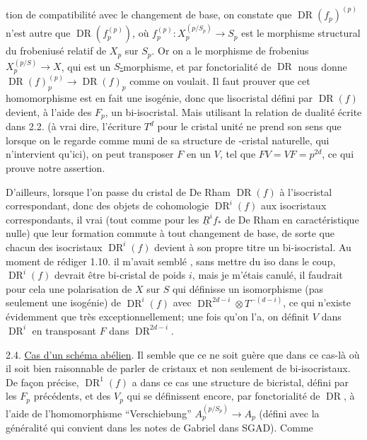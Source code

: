 tion de compatibilité avec le changement de base, on constate que $\operatorname{DR}(f_p)^{(p)}$  n'est autre que $\operatorname{DR}(f_p^{(p)})$, où $f_p^{(p)}:X_p^{(p/S_p)}\longrightarrow S_p$ est le morphisme structural du frobeniusé relatif de $X_p$ sur $S_p$. Or on a le morphisme de frobenius $X_p^{(p/S)}\longrightarrow X$, qui est un $S$\uline{-}morphisme, et par fonctorialité de $\operatorname{DR}$ nous donne $\operatorname{DR}(f)_p^{(p)}\longrightarrow\operatorname{DR}(f)_p$ comme on voulait. Il faut prouver que cet homomorphisme est en fait une isogénie, donc que lisocristal défini par $\operatorname{DR}(f)$ devient, à l'aide des $F_p$, un bi-isocristal. Mais utilisant la relation de dualité écrite dans 2.2. (à vrai dire, l'écriture $T^d$ pour le cristal unité ne prend son sens que lorsque on le regarde comme muni de sa structure de -cristal naturelle, qui n'intervient qu'ici), on peut transposer $F$ en un $V$, tel que $FV=VF=p^{2d}$, ce qui prouve notre assertion.

D'ailleurs, lorsque l'on passe du cristal de De Rham $\operatorname{DR}(f)$ à l'isocristal correspondant,  donc des objets de cohomologie $\operatorname{DR}^i(f)$ aux isocristaux correspondants,  il   vrai (tout comme pour les $\underline{R}^if_*$ de De Rham en caractéristique nulle) que leur formation commute à tout changement de base, de sorte que chacun des isocristaux $\operatorname{DR}^i(f)$ devient à son propre titre un bi-isocristal. Au moment de rédiger 1.10. il m'avait semblé , sans mettre du iso dans le coup,  $\operatorname{DR}^i(f)$ devrait être  bi-cristal de poids $i$, mais je m'étais canulé, il faudrait pour cela une polarisation de $X$ sur $S$ qui définisse un isomorphisme (pas seulement une isogénie) de $\operatorname{DR}^i(f)$ avec $\operatorname{DR}^{2d-i}\otimes T^{-(d-i)}$, ce qui n'existe évidemment que très exceptionnellement; une fois qu'on l'a, on définit $V$ dans $\operatorname{DR}^i$ en transposant $F$ dans $\operatorname{DR}^{2d-i}$.

2.4. \uline{Cas d'un schéma abélien}. Il semble que ce ne soit guère que dans ce cas-là où il soit bien raisonnable de parler de cristaux et non seulement de bi-isocristaux. De façon précise, $\operatorname{DR}^1(f)$ a dans ce cas une structure de bicristal, défini par les $F_p$ précédents, et des $V_p$ qui se définissent encore, par fonctorialité de $\operatorname{DR}$, à l'aide de l'homomorphisme ``Verschiebung'' $A_p^{(p/S_p)}\longrightarrow A_p$ (défini avec la généralité qui convient dans les notes de Gabriel dans SGAD). Comme


